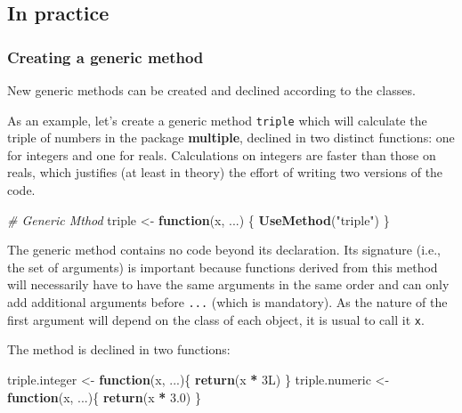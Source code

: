 \documentclass[
  12pt,
  american,
  a4paper,
  extrafontsizes,onecolumn,openright
  ]{memoir}
\newenvironment{Shaded}{\begin{snugshade}}{\end{snugshade}}
\newcommand{\CommentTok}[1]{\textcolor[rgb]{0.56,0.35,0.01}{\textit{#1}}}
\newcommand{\ControlFlowTok}[1]{\textcolor[rgb]{0.13,0.29,0.53}{\textbf{#1}}}
\newcommand{\DataTypeTok}[1]{\textcolor[rgb]{0.13,0.29,0.53}{#1}}
\newcommand{\DecValTok}[1]{\textcolor[rgb]{0.00,0.00,0.81}{#1}}
\newcommand{\FloatTok}[1]{\textcolor[rgb]{0.00,0.00,0.81}{#1}}
\newcommand{\FunctionTok}[1]{\textcolor[rgb]{0.13,0.29,0.53}{\textbf{#1}}}
\newcommand{\NormalTok}[1]{#1}
\newcommand{\OtherTok}[1]{\textcolor[rgb]{0.56,0.35,0.01}{#1}}
\newcommand{\SpecialCharTok}[1]{\textcolor[rgb]{0.81,0.36,0.00}{\textbf{#1}}}
\newcommand{\StringTok}[1]{\textcolor[rgb]{0.31,0.60,0.02}{#1}}
\begin{document}
\normalsize

\subsection{In practice}\label{in-practice}

\subsubsection{Creating a generic method}\label{creating-a-generic-method}

New generic methods can be created and declined according to the classes.

As an example, let's create a generic method \texttt{triple} which will calculate the triple of numbers in the package \textbf{multiple}, declined in two distinct functions: one for integers and one for reals.
Calculations on integers are faster than those on reals, which justifies (at least in theory) the effort of writing two versions of the code.

\scriptsize

\begin{Shaded}
\begin{Highlighting}[]
\CommentTok{\# Generic Mthod}
\NormalTok{triple }\OtherTok{\textless{}{-}} \ControlFlowTok{function}\NormalTok{(x, ...) \{}
  \FunctionTok{UseMethod}\NormalTok{(}\StringTok{"triple"}\NormalTok{)}
\NormalTok{\}}
\end{Highlighting}
\end{Shaded}

\normalsize

The generic method contains no code beyond its declaration.
Its signature (i.e., the set of arguments) is important because functions derived from this method will necessarily have to have the same arguments in the same order and can only add additional arguments before \texttt{...} (which is mandatory).
As the nature of the first argument will depend on the class of each object, it is usual to call it \texttt{x}.

The method is declined in two functions:

\scriptsize

\begin{Shaded}
\begin{Highlighting}[]
\NormalTok{triple.integer }\OtherTok{\textless{}{-}} \ControlFlowTok{function}\NormalTok{(x, ...)\{}
  \FunctionTok{return}\NormalTok{(x }\SpecialCharTok{*} \DecValTok{3}\DataTypeTok{L}\NormalTok{)}
\NormalTok{\}}
\NormalTok{triple.numeric }\OtherTok{\textless{}{-}} \ControlFlowTok{function}\NormalTok{(x, ...)\{}
  \FunctionTok{return}\NormalTok{(x }\SpecialCharTok{*} \FloatTok{3.0}\NormalTok{)}
\NormalTok{\}}
\end{Highlighting}
\end{Shaded}
\end{document}
